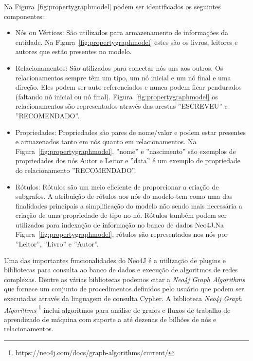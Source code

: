 Na Figura~\ref{fig:propertygraphmodel} podem ser identificados os seguintes componentes:

\begin{itemize}
    \item Nós ou Vértices: São utilizados para armazenamento de informações da entidade. Na Figura~\ref{fig:propertygraphmodel} estes são os livros, leitores e autores que estão presentes no modelo.
    
    \item Relacionamentos: São utilizados para conectar nós uns aos outros. Os relacionamentos sempre têm um tipo, um nó inicial e um nó final e uma direção. 
    Eles podem ser auto-referenciados e nunca podem ficar pendurados (faltando nó inicial ou nó final). Figura~\ref{fig:propertygraphmodel} os relacionamentos são representados através das arestas ''ESCREVEU'' e  ''RECOMENDADO''.
    
    \item Propriedades: Propriedades são pares de nome/valor e podem estar presentes e armazenados tanto em nós quanto em relacionamentos. Na Figura~\ref{fig:propertygraphmodel}, ''nome'' e ''nascimento'' são exemplos de propriedades dos nós Autor e Leitor e ''data'' é um exemplo de propriedade do relacionamento ''RECOMENDADO''.
     
    \item Rótulos: Rótulos são um meio eficiente de proporcionar a criação de subgrafos. A atribuição de rótulos aos nós do modelo tem como uma das finalidades principais a simplificação do modelo não sendo mais necessária a criação de uma propriedade de tipo no nó. Rótulos também podem ser utilizados para indexação de informação no banco de dados Neo4J.Na Figura~\ref{fig:propertygraphmodel}, rótulos são representados nos nós por ''Leitor'', ''Livro'' e ''Autor''.

\end{itemize}

Uma das importantes funcionalidades do Neo4J é a utilização de plugins e bibliotecas para consulta ao banco de dados e execução de algoritmos de redes complexas. 
Dentre as várias bibliotecas podemos citar a \emph{Neo4j Graph Algorithms} que fornece um conjunto de procedimentos definidos pelo usuário que podem ser executadas através da linguagem de consulta Cypher.  
A biblioteca \emph{Neo4j Graph Algorithms} \footnote{https://neo4j.com/docs/graph-algorithms/current/} inclui algoritmos para análise de grafos e fluxos de trabalho de aprendizado de máquina com suporte a até dezenas de bilhões de nós e relacionamentos.


